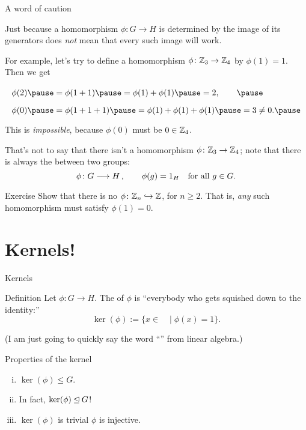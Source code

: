 \documentclass[8pt, handout]{beamer}
\newcommand{\Pause}{\pause}      %
\begin{document}
\begin{frame}{A word of caution} %
  
  Just because a homomorphism $\phi\colon G\to H$ is determined by the
  image of its generators does \emph{not} mean that every such image
  will work.
  
  \medskip\Pause
  
  For example, let's try to define a homomorphism $\phi\colon
  \mathbb{Z}_3\to\mathbb{Z}_4$ by $\phi(1)=1$. \Pause Then we get \vspace{-2mm}
  \[
  \def\arraystretch{1.75}
  \begin{array}{l}
    \phi(2)\Pause=\phi(1+1)\Pause=\phi(1)+\phi(1)\Pause=2,\qquad\Pause
    \\ \phi(0)\Pause=\phi(1+1+1)\Pause=\phi(1)+\phi(1)+\phi(1)\Pause=3\neq
    0. \Pause
  \end{array}
  \]
  This is \emph{impossible}, because $\phi(0)$ must be $0\in\mathbb{Z}_4$.
  
  \medskip\Pause
  
  That's not to say that there isn't a homomorphism
  $\phi\colon\mathbb{Z}_3\to\mathbb{Z}_4$; note that there is always the
   between two groups:
  \[
  \phi\colon G\longrightarrow H\,,\qquad\phi(g)=1_H\quad\text{for all $g\in G$}.
  \]
  
  \Pause
  
  \begin{exampleblock}{Exercise}
    Show that there is no  $\phi\colon\mathbb{Z}_n\hookrightarrow\mathbb{Z}$, for
    $n\geq 2$. That is, \emph{any} such homomorphism must satisfy
    $\phi(1)=0$.
  \end{exampleblock}

\end{frame}


\section{Kernels!}

\begin{frame}{Kernels}
  \begin{block}{Definition}
    Let $\phi:G\to H$. The  of $\phi$ is ``everybody who gets squished down to the identity:'' \pause
    \[\ker(\phi):= \{x\in \phantom{G} \mid \phi(x) = 1\}. \]
  \end{block} \pause
  (I am just going to quickly say the word ``'' from linear algebra.) \pause
  \begin{exampleblock}{Properties of the kernel}
    \begin{enumerate}[(i)]
      \item $\ker(\phi) \leq G$. \pause
      \item In fact, $\ker(\phi) \unlhd G$! \pause
      \item $\ker(\phi)$ is trivial  $\phi$ is injective.
    \end{enumerate}
  \end{exampleblock}
\end{frame}
\end{document}

